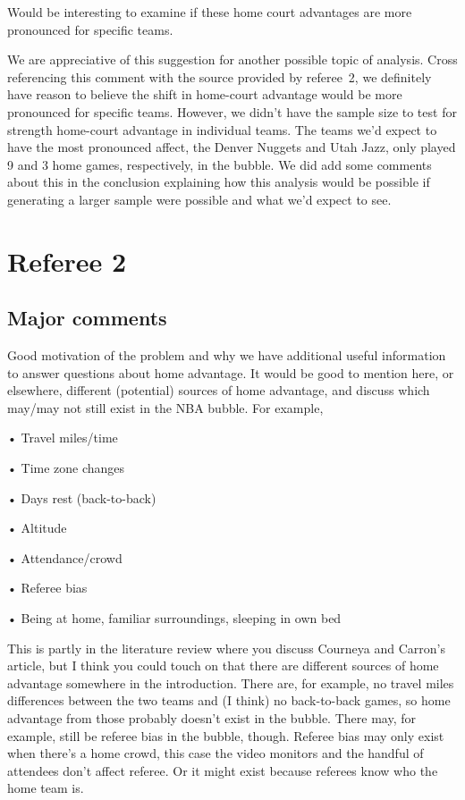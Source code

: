 \documentclass[12pt]{article}
\newenvironment{comment}%
{\begin{quoting}\noindent\small\it\ignorespaces%
  }{\end{quoting}}
\begin{document}
\begin{comment}
Would be interesting to examine if these home court advantages are more pronounced for specific teams.
\end{comment}

 We are appreciative of this suggestion for another possible topic of analysis. Cross referencing this comment with the source provided by referee~2, we definitely have reason to believe the shift in home-court advantage would be more pronounced for specific teams. However, we didn't have the sample size to test for strength home-court advantage in individual teams. The teams we'd expect to have the most pronounced affect, the Denver Nuggets and Utah Jazz, only played 9 and 3 home games, respectively, in the bubble. We did add some comments about this in the conclusion explaining how this analysis would be possible if generating a larger sample were possible and what we'd expect to see.


\section*{Referee 2}

\subsection*{Major comments}

\begin{comment}
Good motivation of the problem and why we have additional useful information to answer questions about
home advantage.
It would be good to mention here, or elsewhere, different (potential) sources of home advantage, and discuss
which may/may not still exist in the NBA bubble. For example,
\item
• Travel miles/time
\item
• Time zone changes
\item
• Days rest (back-to-back)
\item
• Altitude
\item
• Attendance/crowd
\item
• Referee bias
\item
• Being at home, familiar surroundings, sleeping in own bed
\item
This is partly in the literature review where you discuss Courneya and Carron’s article, but I think you could
touch on that there are different sources of home advantage somewhere in the introduction. There are, for
example, no travel miles differences between the two teams and (I think) no back-to-back games, so home
advantage from those probably doesn’t exist in the bubble. There may, for example, still be referee bias in
the bubble, though. Referee bias may only exist when there’s a home crowd, this case the video monitors
and the handful of attendees don’t affect referee. Or it might exist because referees know who the home
team is.
\end{comment}
\end{document}
